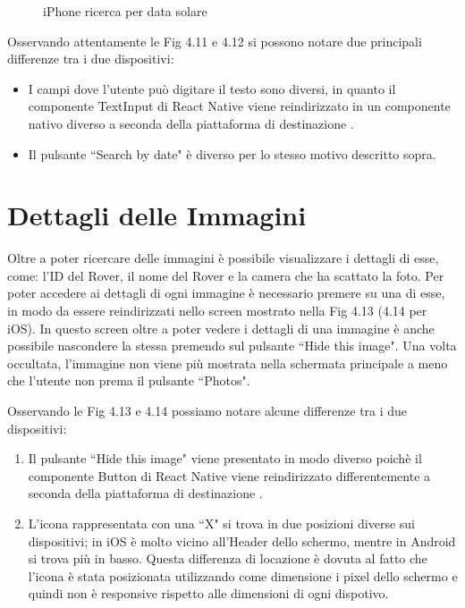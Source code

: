 \begin{figure}[h]
\begin{minipage}[h]{0.47\textwidth}
        \caption{\label{SearchbyDateIphone}iPhone ricerca per data solare}
    \end{minipage}
\end{figure}

Osservando attentamente le Fig 4.11 e 4.12 si possono notare due principali differenze tra i due dispositivi:
\begin{itemize}
    \item I campi dove l'utente pu\`o digitare il testo sono diversi, in quanto il componente TextInput di React Native viene reindirizzato in un componente nativo diverso a seconda della piattaforma di destinazione \cite{ReactNativeComponent}.
    \item Il pulsante ``Search by date" \`e diverso per lo stesso motivo descritto sopra.
\end{itemize}

\section{Dettagli delle Immagini}
Oltre a poter ricercare delle immagini \`e possibile visualizzare i dettagli di esse, come: l'ID del Rover, il nome del Rover e la camera che ha scattato la foto.
Per poter accedere ai dettagli di ogni immagine \`e necessario premere su una di esse, in modo da essere reindirizzati nello screen mostrato nella Fig 4.13 (4.14 per iOS).
In questo screen oltre a poter vedere i dettagli di una immagine \`e anche possibile nascondere la stessa premendo sul pulsante ``Hide this image".
Una volta occultata, l'immagine non viene pi\`u mostrata nella schermata principale a meno che l'utente non prema il pulsante ``Photos".

Osservando le Fig 4.13 e 4.14 possiamo notare alcune differenze tra i due dispositivi:
\begin{enumerate}
    \item Il pulsante ``Hide this image" viene presentato in modo diverso poich\`e il componente Button di React Native viene reindirizzato differentemente a seconda della piattaforma di destinazione \cite{ReactNativeComponent}.
    \item L'icona rappresentata con una ``X" si trova in due posizioni diverse sui dispositivi; in iOS \`e molto vicino all'Header dello schermo, mentre in Android si trova pi\`u in basso. Questa differenza di locazione
          \`e dovuta al fatto che l'icona \`e stata posizionata utilizzando come dimensione i pixel dello schermo e quindi non \`e responsive rispetto alle dimensioni di ogni dispotivo.
\end{enumerate}

